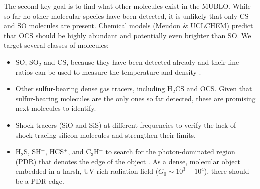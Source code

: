\documentclass[12pt,a4paper]{article}  %
\begin{document}
The second key goal is to find what other molecules exist in the MUBLO.
While so far no other molecular species have been detected, it is unlikely that only CS and SO molecules are present.
Chemical models (Meudon \& UCLCHEM) predict that OCS should be highly abundant and potentially even brighter than SO.
We target several classes of molecules:
\begin{itemize}
 \item SO, SO$_2$ and CS, because they have been detected already and their line ratios can be used to measure the temperature and density \citep{Ginsburg2024}.
 \item Other sulfur-bearing dense gas tracers, including H$_2$CS and OCS.  Given that sulfur-bearing molecules are the only ones so far detected, these are promising next molecules to identify.
 \item Shock tracers (SiO and SiS) at different frequencies to verify the lack of shock-tracing silicon molecules and strengthen their limits.
 \item H$_2$S, SH$^+$, HCS$^+$, and C$_3$H$^+$ to search for the photon-dominated region (PDR) that denotes the edge of the object \citep{Pety2012,McGuire2014}.
       As a dense, molecular object embedded in a harsh, UV-rich radiation field ($G_0\sim10^3-10^4$), there should be a PDR edge.%
 \end{itemize}


\end{document}
